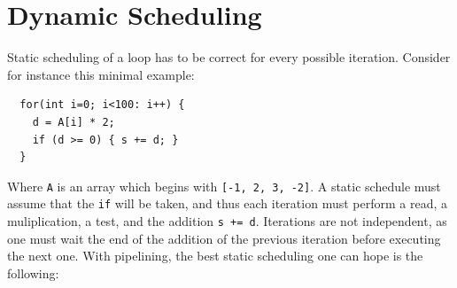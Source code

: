 \documentclass{article}
\begin{document}
\section{Dynamic Scheduling}
\label{sec:dynamic}
Static scheduling of a loop has to be correct for every possible iteration.
Consider for instance this minimal example:
\begin{lstlisting}
  for(int i=0; i<100: i++) {
    d = A[i] * 2;
    if (d >= 0) { s += d; }
  } 
\end{lstlisting}
Where \texttt{A} is an array which begins with \texttt{[-1, 2, 3, -2]}.
A static schedule must assume that the \texttt{if} will be taken, and thus each iteration must perform a read, a muliplication, a test, and the addition \texttt{s += d}. Iterations are not independent, as one must wait the end of the addition of the previous iteration before executing the next one.
With pipelining, the best static scheduling one can hope is the following:
\end{document}
